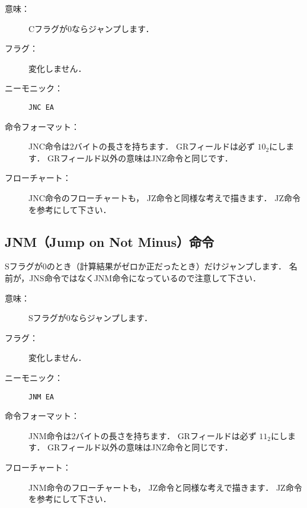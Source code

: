 \begin{description}
\item[意味：]Cフラグが0ならジャンプします．

\item[フラグ：]変化しません．

\item[ニーモニック：]{\tt JNC  EA}

\item[命令フォーマット：]JNC命令は2バイトの長さを持ちます．
GRフィールドは必ず $10_2$にします．
GRフィールド以外の意味はJNZ命令と同じです．


\item[フローチャート：]JNC命令のフローチャートも，
JZ命令と同様な考えで描きます．
JZ命令を参考にして下さい．

\end{description}

\subsection{JNM（Jump on Not Minus）命令}
Sフラグが0のとき（計算結果がゼロか正だったとき）だけジャンプします．
名前が，JNS命令ではなくJNM命令になっているので注意して下さい．

\begin{description}
\item[意味：]Sフラグが0ならジャンプします．

\item[フラグ：]変化しません．

\item[ニーモニック：]{\tt JNM  EA}

\item[命令フォーマット：]JNM命令は2バイトの長さを持ちます．
GRフィールドは必ず $11_2$にします．
GRフィールド以外の意味はJNZ命令と同じです．


\item[フローチャート：]JNM命令のフローチャートも，
JZ命令と同様な考えで描きます．
JZ命令を参考にして下さい．

\end{description}

